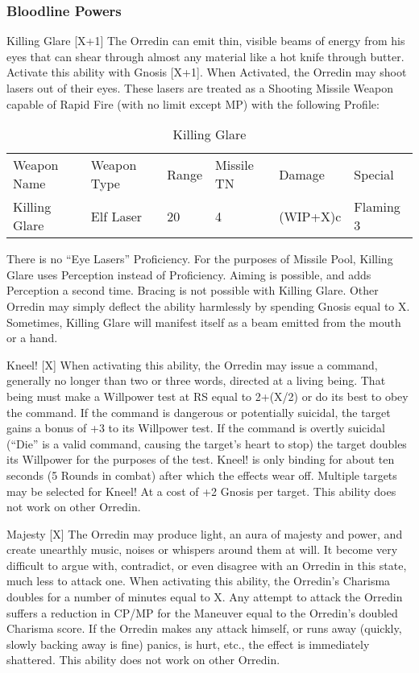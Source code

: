\documentclass[oneside,11pt,english]{book}
\begin{document}
\subsubsection{Bloodline Powers}
Killing Glare [X+1] %
The Orredin can emit thin, visible beams of energy from his eyes that can shear through almost any material like a hot knife through butter. Activate this ability with Gnosis [X+1].
When Activated, the Orredin may shoot lasers out of their eyes. These lasers are treated as a Shooting 
Missile Weapon capable of Rapid Fire (with no limit except MP) with the following Profile:
\begin{table}[!ht]
	\caption{Killing Glare}
	\label{tab:Killing Glare}
	\begin{tabu} to \textwidth {XXX[-1,c]X[c]XX}
Weapon Name&Weapon Type&Range& Missile TN&Damage&Special\\
Killing Glare&Elf Laser&20&4&(WIP+X)c&Flaming 3\\
	\end{tabu}
\end{table}


There is no “Eye Lasers” Proficiency. For the purposes of Missile Pool, Killing Glare uses Perception instead of Proficiency. Aiming is possible, and adds Perception a second time. Bracing is not possible with Killing Glare. Other Orredin may simply deflect the ability harmlessly by spending Gnosis equal to X. Sometimes, Killing Glare will manifest itself as a beam emitted from the mouth or a hand.


Kneel! [X] %
When activating this ability, the Orredin may issue a command, generally no longer than two or three 
words, directed at a living being. That being must make a Willpower test at RS equal to 2+(X/2) or do its 
best to obey the command. If the command is dangerous or potentially suicidal, the target gains a bonus 
of +3 to its Willpower test. If the command is overtly suicidal (“Die” is a valid command, causing the 
target’s heart to stop) the target doubles its Willpower for the purposes of the test. Kneel! is only binding 
for about ten seconds (5 Rounds in combat) after which the effects wear off. Multiple targets may be 
selected for Kneel! At a cost of +2 Gnosis per target. This ability does not work on other Orredin. 


Majesty [X] %
The Orredin may produce light, an aura of majesty and power, and create unearthly music, noises or 
whispers around them at will. It become very difficult to argue with, contradict, or even disagree with an 
Orredin in this state, much less to attack one. When activating this ability, the Orredin's Charisma doubles for a number of minutes equal to X. Any attempt to attack the Orredin suffers a reduction in CP/MP for 
the Maneuver equal to the Orredin's doubled Charisma score. 
If the Orredin makes any attack himself, or runs away (quickly, slowly backing away is fine) panics, is 
hurt, etc., the effect is immediately shattered. 
This ability does not work on other Orredin. 
\end{document}
